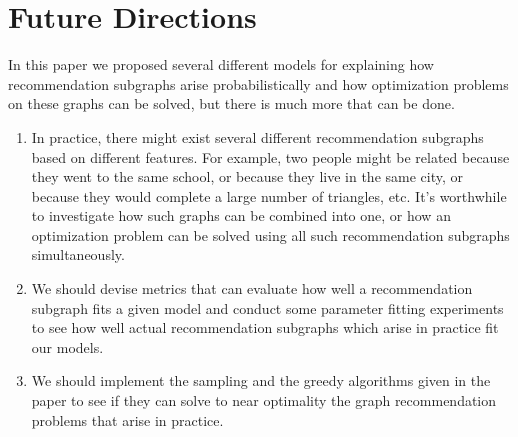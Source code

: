 \section{Future Directions}
In this paper we proposed several different models for explaining how
recommendation subgraphs arise probabilistically and how optimization 
problems on these graphs can be solved, but there is much more that
can be done.

\begin{enumerate}

\item In practice, there might exist several different
  recommendation subgraphs based on different features. For example,
  two people might be related because they went to the same 
  school, or because they live in the same city, or because they
  would complete a large number of triangles, etc. It's worthwhile
  to investigate how such graphs can be combined into one, or how
  an optimization problem can be solved using all such 
  recommendation subgraphs simultaneously.

\item We should devise metrics that can evaluate how well a
  recommendation subgraph fits a given model and conduct some parameter
  fitting experiments to see how well actual recommendation subgraphs
  which arise in practice fit our models.

\item We should implement the sampling and the greedy algorithms
  given in the paper to see if they can solve to near optimality
  the graph recommendation problems that arise in practice.
\end{enumerate}